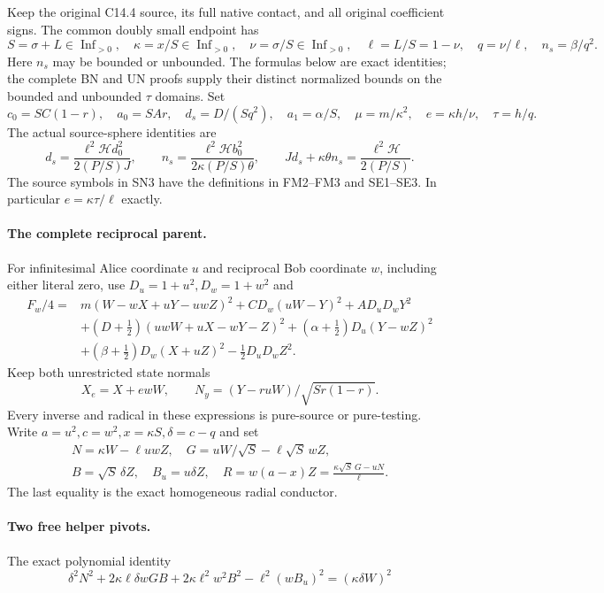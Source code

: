 Keep the original C14.4 source, its full native contact, and all
original coefficient signs.  The common doubly small endpoint has
\[
 S=\sigma+L\in\operatorname{Inf}_{>0},\quad\kappa=x/S\in\operatorname{Inf}_{>0},
 \quad\nu=\sigma/S\in\operatorname{Inf}_{>0},\quad
 \ell=L/S=1-\nu,\quad q=\nu/\ell,\quad n_s=\beta/q^2.
                                                               \tag{SN1}
\]
Here $n_s$ may be bounded or unbounded.  The formulas below are
exact identities; the complete BN and UN proofs supply their distinct
normalized bounds on the bounded and unbounded $\tau$ domains.
Set
\[
 c_0=SC(1-r),\quad a_0=SAr,\quad d_s=D/(Sq^2),\quad
 a_1=\alpha/S,\quad\mu=m/\kappa^2,\quad
 e=\kappa h/\nu,\quad\tau=h/q.                         \tag{SN2}
\]
The actual source-sphere identities are
\[
 d_s=\frac{\ell^2\mathcal H d_0^2}{2(P/S)J},\qquad
 n_s=\frac{\ell^2\mathcal H b_0^2}{2\kappa(P/S)\theta},\qquad
 Jd_s+\kappa\theta n_s=\frac{\ell^2\mathcal H}{2(P/S)}.   \tag{SN3}
\]
The source symbols in SN3 have the definitions in FM2--FM3 and
SE1--SE3.  In particular $e=\kappa\tau/\ell$ exactly.
\paragraph{The complete reciprocal parent.}
For infinitesimal Alice coordinate $u$ and reciprocal Bob coordinate
$w$, including either literal zero, use $D_u=1+u^2,D_w=1+w^2$ and
\[
\begin{split}
 F_w/4={}&m(W-wX+uY-uwZ)^2+CD_w(uW-Y)^2+AD_uD_wY^2\\
 &+(D+\tfrac12)(uwW+uX-wY-Z)^2
 +(\alpha+\tfrac12)D_u(Y-wZ)^2\\
 &+(\beta+\tfrac12)D_w(X+uZ)^2-\tfrac12D_uD_wZ^2.
\end{split}\tag{SN5}
\]
Keep both unrestricted state normals
\[
 X_e=X+ewW,\qquad N_y=(Y-ruW)/\sqrt{Sr(1-r)}.
 \tag{SN6}
\]
Every inverse and radical in these expressions is pure-source or
pure-testing. Write $a=u^2,c=w^2,x=\kappa S,\delta=c-q$ and set
\[
\begin{gathered}
 N=\kappa W-\ell uwZ,\quad G=uW/\sqrt S-\ell\sqrt S\,wZ,\\
 B=\sqrt S\,\delta Z,\quad B_u=u\delta Z,\quad
 R=w(a-x)Z=\frac{\kappa\sqrt S\,G-uN}{\ell}.
\end{gathered}\tag{SN7}
\]
The last equality is the exact homogeneous radial conductor.

\paragraph{Two free helper pivots.}
The exact polynomial identity
\[
 \delta^2N^2+2\kappa\ell\delta wGB
       +2\kappa\ell^2w^2B^2-\ell^2(wB_u)^2
                  =(\kappa\delta W)^2
 \tag{SN8}
\]

